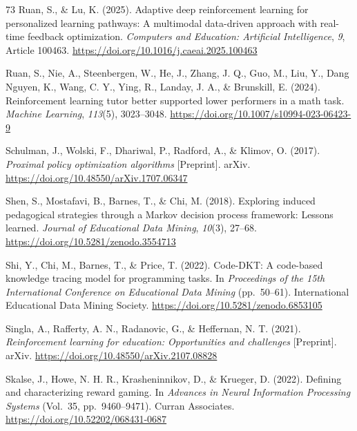 \documentclass[a4paper,preprint,12pt,authoryear]{elsarticle}
\begin{document}
\begin{thebibliography}{73}
Ruan, S., \& Lu, K. (2025). Adaptive deep reinforcement learning for personalized learning pathways: A multimodal data-driven approach with real-time feedback optimization. \textit{Computers and Education: Artificial Intelligence}, \textit{9}, Article 100463. \url{https://doi.org/10.1016/j.caeai.2025.100463}

Ruan, S., Nie, A., Steenbergen, W., He, J., Zhang, J. Q., Guo, M., Liu, Y., Dang Nguyen, K., Wang, C. Y., Ying, R., Landay, J. A., \& Brunskill, E. (2024). Reinforcement learning tutor better supported lower performers in a math task. \textit{Machine Learning}, \textit{113}(5), 3023--3048. \url{https://doi.org/10.1007/s10994-023-06423-9}

Schulman, J., Wolski, F., Dhariwal, P., Radford, A., \& Klimov, O. (2017). \textit{Proximal policy optimization algorithms} [Preprint]. arXiv. \url{https://doi.org/10.48550/arXiv.1707.06347}

Shen, S., Mostafavi, B., Barnes, T., \& Chi, M. (2018). Exploring induced pedagogical strategies through a Markov decision process framework: Lessons learned. \textit{Journal of Educational Data Mining}, \textit{10}(3), 27--68. \url{https://doi.org/10.5281/zenodo.3554713}

Shi, Y., Chi, M., Barnes, T., \& Price, T. (2022). Code-DKT: A code-based knowledge tracing model for programming tasks. In \textit{Proceedings of the 15th International Conference on Educational Data Mining} (pp.~50--61). International Educational Data Mining Society. \url{https://doi.org/10.5281/zenodo.6853105}

Singla, A., Rafferty, A. N., Radanovic, G., \& Heffernan, N. T. (2021). \textit{Reinforcement learning for education: Opportunities and challenges} [Preprint]. arXiv. \url{https://doi.org/10.48550/arXiv.2107.08828}

Skalse, J., Howe, N. H. R., Krasheninnikov, D., \& Krueger, D. (2022). Defining and characterizing reward gaming. In \textit{Advances in Neural Information Processing Systems} (Vol.~35, pp.~9460--9471). Curran Associates. \url{https://doi.org/10.52202/068431-0687}


\end{thebibliography}
\end{document}
